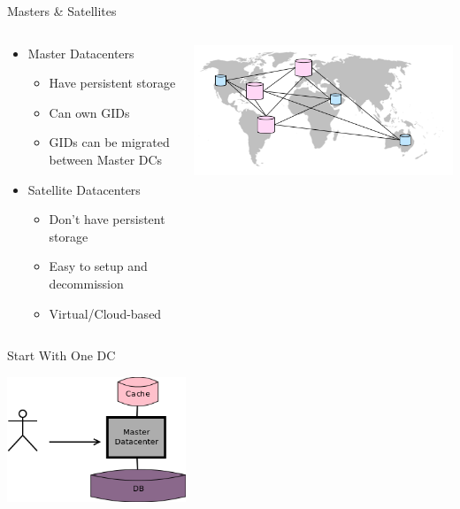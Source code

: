 \documentclass[aspectratio=43]{beamer}
\begin{document}
\begin{frame}{Masters \& Satellites}
    \begin{columns}
        \begin{column}[c]{0.6\textwidth}
            \begin{itemize}
                \item Master Datacenters
                    \begin{itemize}
                        \item Have persistent storage
                        \item Can own GIDs
                        \item GIDs can be migrated between Master DCs
                    \end{itemize}
                \item Satellite Datacenters
                    \begin{itemize}
                        \item Don't have persistent storage
                        \item Easy to setup and decommission
                        \item Virtual/Cloud-based
                    \end{itemize}
            \end{itemize}
        \end{column}
        \begin{column}[c]{0.4\textwidth}
            \includegraphics[width=\textwidth]{images/worldmapdc.png}
        \end{column}
    \end{columns}
\end{frame}

\begin{frame}{Start With One DC}
    \begin{center}
        \includegraphics[width=0.4\textwidth]{images/scalingdcs1.png}
    \end{center}
\end{frame}
\end{document}
